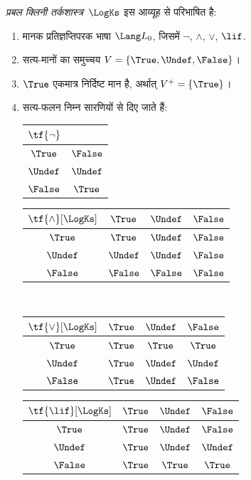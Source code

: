 \documentclass[../../../include/open-logic-section]{subfiles}
\begin{document}
\begin{defn}
\emph{प्रबल क्लिनी तर्कशास्त्र}~$\LogKs$ इस आव्यूह से परिभाषित है:
\begin{enumerate}
  \item मानक प्रतिज्ञप्तिपरक भाषा $\Lang L_0$, जिसमें
  $\lnot$, $\land$, $\lor$, $\lif$.
  \item सत्य-मानों का समुच्चय $V = \{\True, \Undef, \False\}$।
  \item $\True$ एकमात्र निर्दिष्ट मान है, अर्थात् $V^+ = \{\True\}$।
  \item सत्य-फलन निम्न सारणियों से दिए जाते हैं:
  \begin{center}
    \begin{tabular}{c|c} 
      $\tf{\lnot}$ & \\ 
      \hline  
      $\True$ & $\False$ \\ 
      $\Undef$ & $\Undef$ \\
      $\False$ & $\True$ 
    \end{tabular}
    \quad
    \begin{tabular}{c|ccc} 
      $\tf{\land}[\LogKs]$ & $\True$ & $\Undef$ & $\False$ \\ 
      \hline 
      $\True$ & $\True$ & $\Undef$ & $\False$ \\ 
      $\Undef$ & $\Undef$ & $\Undef$ & $\False$\\ 
      $\False$ & $\False$ & $\False$ & $\False$ 
    \end{tabular}
    \\[2ex]
    \begin{tabular}{c|ccc} 
      $\tf{\lor}[\LogKs]$ & $\True$ & $\Undef$ & $\False$ \\ 
      \hline 
      $\True$ & $\True$ & $\True$ & $\True$ \\ 
      $\Undef$ & $\True$ & $\Undef$ & $\Undef$ \\
      $\False$ & $\True$ & $\Undef$ & $\False$ 
    \end{tabular}
    \quad
    \begin{tabular}{c|ccc} 
      $\tf{\lif}[\LogKs]$ & $\True$ & $\Undef$ & $\False$ \\ 
      \hline 
      $\True$ & $\True$ & $\Undef$ & $\False$ \\ 
      $\Undef$ & $\True$ & $\Undef$ & $\Undef$  \\ 
      $\False$ & $\True$ & $\True$ & $\True$ 
    \end{tabular}
  \end{center} 
\end{enumerate}
\end{defn}
\end{document}

